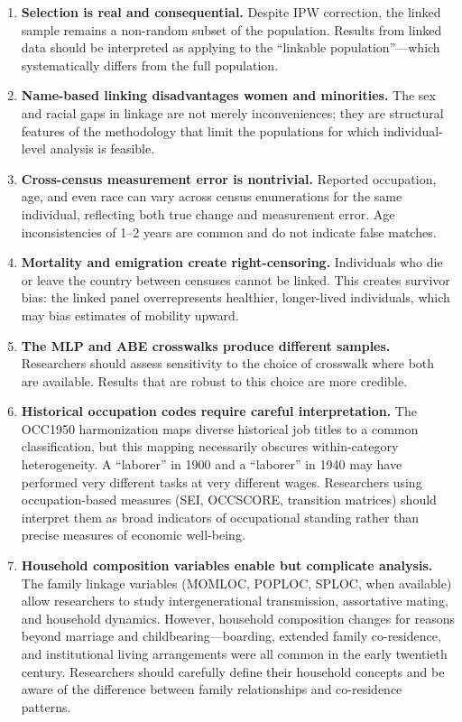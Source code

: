 \documentclass[12pt]{article}
\begin{document}
\begin{enumerate}
\item \textbf{Selection is real and consequential.} Despite IPW correction, the linked sample remains a non-random subset of the population. Results from linked data should be interpreted as applying to the ``linkable population''---which systematically differs from the full population.

\item \textbf{Name-based linking disadvantages women and minorities.} The sex and racial gaps in linkage are not merely inconveniences; they are structural features of the methodology that limit the populations for which individual-level analysis is feasible.

\item \textbf{Cross-census measurement error is nontrivial.} Reported occupation, age, and even race can vary across census enumerations for the same individual, reflecting both true change and measurement error. Age inconsistencies of 1--2 years are common and do not indicate false matches.

\item \textbf{Mortality and emigration create right-censoring.} Individuals who die or leave the country between censuses cannot be linked. This creates survivor bias: the linked panel overrepresents healthier, longer-lived individuals, which may bias estimates of mobility upward.

\item \textbf{The MLP and ABE crosswalks produce different samples.} Researchers should assess sensitivity to the choice of crosswalk where both are available. Results that are robust to this choice are more credible.

\item \textbf{Historical occupation codes require careful interpretation.} The OCC1950 harmonization maps diverse historical job titles to a common classification, but this mapping necessarily obscures within-category heterogeneity. A ``laborer'' in 1900 and a ``laborer'' in 1940 may have performed very different tasks at very different wages. Researchers using occupation-based measures (SEI, OCCSCORE, transition matrices) should interpret them as broad indicators of occupational standing rather than precise measures of economic well-being.

\item \textbf{Household composition variables enable but complicate analysis.} The family linkage variables (MOMLOC, POPLOC, SPLOC, when available) allow researchers to study intergenerational transmission, assortative mating, and household dynamics. However, household composition changes for reasons beyond marriage and childbearing---boarding, extended family co-residence, and institutional living arrangements were all common in the early twentieth century. Researchers should carefully define their household concepts and be aware of the difference between family relationships and co-residence patterns.
\end{enumerate}
\end{document}
